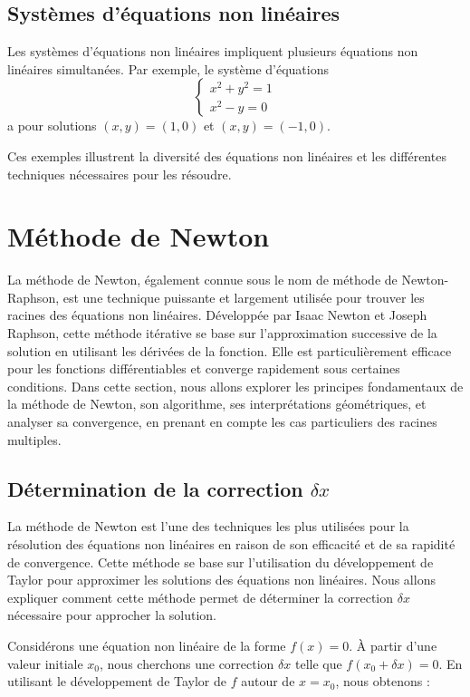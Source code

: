 \documentclass{article}
\begin{document}
\subsection{Systèmes d'équations non linéaires}
Les systèmes d'équations non linéaires impliquent plusieurs équations non linéaires simultanées. Par exemple, le système d'équations
\[
\begin{cases} 
x^2 + y^2 = 1 \\ 
x^2 - y = 0 
\end{cases} 
\]
a pour solutions $(x, y) = (1, 0)$ et $(x, y) = (-1, 0)$.

Ces exemples illustrent la diversité des équations non linéaires et les différentes techniques nécessaires pour les résoudre.

\section{Méthode de Newton}
La méthode de Newton, également connue sous le nom de méthode de Newton-Raphson, est une technique puissante et largement utilisée pour trouver les racines des équations non linéaires. Développée par Isaac Newton et Joseph Raphson, cette méthode itérative se base sur l'approximation successive de la solution en utilisant les dérivées de la fonction. Elle est particulièrement efficace pour les fonctions différentiables et converge rapidement sous certaines conditions. Dans cette section, nous allons explorer les principes fondamentaux de la méthode de Newton, son algorithme, ses interprétations géométriques, et analyser sa convergence, en prenant en compte les cas particuliers des racines multiples.

\subsection{Détermination de la correction \(\delta x\)}
La méthode de Newton est l'une des techniques les plus utilisées pour la résolution des équations non linéaires en raison de son efficacité et de sa rapidité de convergence. Cette méthode se base sur l'utilisation du développement de Taylor pour approximer les solutions des équations non linéaires. Nous allons expliquer comment cette méthode permet de déterminer la correction \(\delta x\) nécessaire pour approcher la solution.

Considérons une équation non linéaire de la forme \( f(x) = 0 \). À partir d'une valeur initiale \( x_0 \), nous cherchons une correction \(\delta x\) telle que \( f(x_0 + \delta x) = 0 \). En utilisant le développement de Taylor de \( f \) autour de \( x = x_0 \), nous obtenons :
\end{document}
